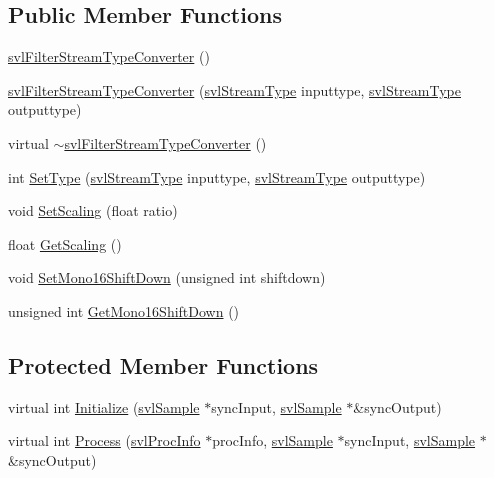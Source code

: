 \subsection*{Public Member Functions}
\begin{DoxyCompactItemize}
\item 
\hyperlink{classsvl_filter_stream_type_converter_aaa77a347109c22715ab2424785271388}{svl\-Filter\-Stream\-Type\-Converter} ()
\item 
\hyperlink{classsvl_filter_stream_type_converter_a9a169d5564d8e95cd43e11eea29d97d5}{svl\-Filter\-Stream\-Type\-Converter} (\hyperlink{svl_definitions_8h_aa00696d338a58db361335a01fd11e122}{svl\-Stream\-Type} inputtype, \hyperlink{svl_definitions_8h_aa00696d338a58db361335a01fd11e122}{svl\-Stream\-Type} outputtype)
\item 
virtual \hyperlink{classsvl_filter_stream_type_converter_aeb176e9f04ed9002d8331db010bdc797}{$\sim$svl\-Filter\-Stream\-Type\-Converter} ()
\item 
int \hyperlink{classsvl_filter_stream_type_converter_a0c8243911e530f637a47db916ee48e5d}{Set\-Type} (\hyperlink{svl_definitions_8h_aa00696d338a58db361335a01fd11e122}{svl\-Stream\-Type} inputtype, \hyperlink{svl_definitions_8h_aa00696d338a58db361335a01fd11e122}{svl\-Stream\-Type} outputtype)
\item 
void \hyperlink{classsvl_filter_stream_type_converter_a36b3dca1d8716b3ffea707b3f69239eb}{Set\-Scaling} (float ratio)
\item 
float \hyperlink{classsvl_filter_stream_type_converter_add52c851017c18ab5c00d749b4b02f28}{Get\-Scaling} ()
\item 
void \hyperlink{classsvl_filter_stream_type_converter_acd2449bb21934792b41b955377485f5a}{Set\-Mono16\-Shift\-Down} (unsigned int shiftdown)
\item 
unsigned int \hyperlink{classsvl_filter_stream_type_converter_aac347664a8cee09a723cd954c921f448}{Get\-Mono16\-Shift\-Down} ()
\end{DoxyCompactItemize}
\subsection*{Protected Member Functions}
\begin{DoxyCompactItemize}
\item 
virtual int \hyperlink{classsvl_filter_stream_type_converter_aee25fce3d2cff160cdf8d6377d6e157c}{Initialize} (\hyperlink{classsvl_sample}{svl\-Sample} $\ast$sync\-Input, \hyperlink{classsvl_sample}{svl\-Sample} $\ast$\&sync\-Output)
\item 
virtual int \hyperlink{classsvl_filter_stream_type_converter_a4c9a99dcf5598b4fb1fa1b844ec1c8ee}{Process} (\hyperlink{structsvl_proc_info}{svl\-Proc\-Info} $\ast$proc\-Info, \hyperlink{classsvl_sample}{svl\-Sample} $\ast$sync\-Input, \hyperlink{classsvl_sample}{svl\-Sample} $\ast$\&sync\-Output)
\end{DoxyCompactItemize}
